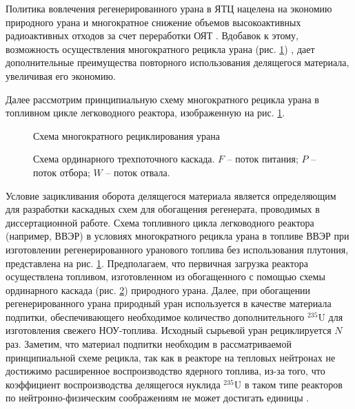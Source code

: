 Политика вовлечения регенерированного урана в ЯТЦ нацелена на экономию природного урана и многократное снижение объемов высокоактивных радиоактивных отходов за счет переработки ОЯТ \cite{delculAnalysisReuseUranium2009}. Вдобавок к этому, возможность осуществления многократного рецикла урана (рис. \ref{recycle}) , дает дополнительные преимущества повторного использования делящегося материала, увеличивая его экономию.

Далее рассмотрим принципиальную схему многократного рецикла урана в топливном цикле легководного реактора, изображенную на рис. \ref{recycle}.

\begin{figure}[ht]
  \caption{Схема многократного рециклирования урана}\label{recycle}
\end{figure}

\begin{figure}[ht]
  \caption{Схема ординарного трехпоточного каскада. $F$ -- поток питания; $P$ -- поток отбора; $W$ -- поток отвала.}\label{ordinary}
\end{figure}

Условие зацикливания оборота делящегося материала является определяющим для разработки каскадных схем для обогащения регенерата, проводимых в диссертационной работе. Схема топливного цикла легководного реактора (например, ВВЭР) в условиях многократного рецикла урана в топливе ВВЭР при изготовлении регенерированного уранового топлива без использования плутония, представлена на рис. \ref{recycle}. Предполагаем, что первичная загрузка реактора осуществлена топливом, изготовленном из обогащенного с помощью схемы ординарного каскада (рис. \ref{ordinary}) природного урана. Далее, при обогащении регенерированного урана природный уран используется в качестве материала подпитки, обеспечивающего необходимое количество дополнительного $^{235}$U для изготовления свежего НОУ-топлива. Исходный сырьевой уран рециклируется $N$ раз. Заметим, что материал подпитки необходим в рассматриваемой принципиальной схеме рецикла, так как в реакторе на тепловых нейтронах не достижимо расширенное воспроизводство ядерного топлива, из-за того, что коэффициент воспроизводства делящегося нуклида $^{235}$U в таком типе реакторов по нейтронно-физическим соображениям не может достигать единицы \cite{ignatevVliyanieVidaTopliva2020}.



